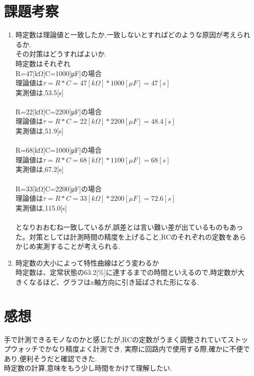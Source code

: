 \documentclass[titlepage]{jarticle}
\begin{document}
\section{課題考察}
\begin{enumerate}
    \item 時定数は理論値と一致したか,一致しないとすればどのような原因が考えられるか.\\その対策はどうすればよいか.\\
          時定数はそれぞれ\\
          R=47[kΩ]C=1000[μF]の場合\\
          理論値は$τ=R*C=47[kΩ]*1000[μF]=47[s]$\\
          実測値は,53.5[s]\\\\
          R=22[kΩ]C=2200[μF]の場合\\
          理論値は$τ=R*C=22[kΩ]*2200[μF]=48.4[s]$\\
          実測値は,51.9[s]\\\\
          R=68[kΩ]C=1000[μF]の場合\\
          理論値は$τ=R*C=68[kΩ]*1100[μF]=68[s]$\\
          実測値は,67.2[s]\\\\
          R=33[kΩ]C=2200[μF]の場合\\
          理論値は$τ=R*C=33[kΩ]*2200[μF]=72.6[s]$\\
          実測値は,115.0[s]\\\\
          となりおおむね一致しているが,誤差とは言い難い差が出ているものもあった。対策としては計測時間の精度を上げること,RCのそれぞれの定数をあらかじめ実測することが考えられる.
    \item 時定数の大小によって特性曲線はどう変わるか\\
          時定数は、定常状態の63.2[\%]に達するまでの時間といえるので,時定数が大きくなるほど、グラフはx軸方向に引き延ばされた形になる.
\end{enumerate}


\section{感想}
手で計測できるモノなのかと感じたが,RCの定数がうまく調整されていてストップウォッチでかなり精度よく計測でき,
実際に回路内で使用する際,確かに不便であり,便利そうだと確認できた.\\
時定数の計算,意味をもう少し時間をかけて理解したい.
\end{document}
